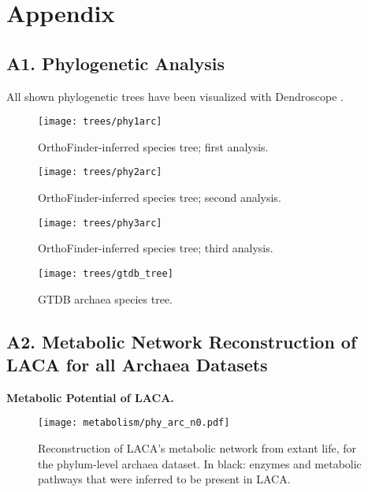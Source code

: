 \newpage
\appendix
\section{Appendix}
\setcounter{figure}{0}
\setcounter{table}{0}
\noappendixindent

\subsection*{A1. Phylogenetic Analysis}
\normalsize
All shown phylogenetic trees have been visualized with Dendroscope \cite{huson2012}.

\begin{figure}[h!tbp]
    \centering
    \renewcommand{\thefigure}{A\arabic{figure}}
    \texttt{[image: trees/phy1arc]}
    \caption{OrthoFinder-inferred species tree; first analysis.}
    \label{phylum_trees1}
\end{figure}

\begin{figure}[h!tbp]
    \centering
    \renewcommand{\thefigure}{A\arabic{figure}}
    \texttt{[image: trees/phy2arc]}
    \caption{OrthoFinder-inferred species tree; second analysis.}
    \label{phylum_trees2}
\end{figure}

\begin{figure}[h!tbp]
    \centering
    \renewcommand{\thefigure}{A\arabic{figure}}
    \texttt{[image: trees/phy3arc]}
    \caption{OrthoFinder-inferred species tree; third analysis.}
    \label{phylum_trees3}
\end{figure}

\begin{figure}[h!tbp]
    \centering
    \renewcommand{\thefigure}{A\arabic{figure}}
    \texttt{[image: trees/gtdb\_tree]}
    \caption{GTDB archaea species tree.}
    \label{gtdb_tree}
\end{figure}

\newpage
\subsection*{A2. Metabolic Network Reconstruction of LACA for all Archaea Datasets}
\textbf{Metabolic Potential of LACA.}

\begin{figure}[H]
    \centering
    \texttt{[image: metabolism/phy\_arc\_n0.pdf]}
    \caption{Reconstruction of LACA's metabolic network from extant life, for the phylum-level archaea dataset. In black: enzymes and metabolic pathways that were inferred to be present in LACA.}
    \label{phy4arc_metnet}
\end{figure}   


